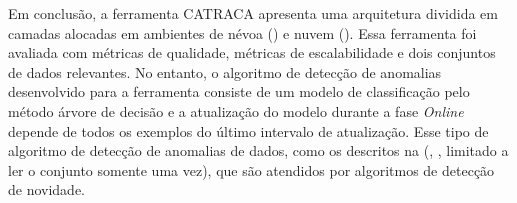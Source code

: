 Em conclusão, a ferramenta CATRACA apresenta uma arquitetura dividida em camadas
alocadas em ambientes de névoa (\fog) e nuvem (\cloud).
Essa ferramenta foi avaliada com métricas de qualidade, métricas de
escalabilidade e dois conjuntos de dados relevantes.
No entanto, o algoritmo de detecção de anomalias desenvolvido para a ferramenta
consiste de um modelo de classificação pelo método árvore de decisão e
a atualização do modelo durante a fase \emph{Online} depende de todos os exemplos do
último intervalo de atualização.
Esse tipo de algoritmo de detecção de anomalias 
 de dados, como os
descritos na  (\drift, \evolution, limitado a ler o conjunto somente
uma vez), que são atendidos por algoritmos de detecção de novidade.



